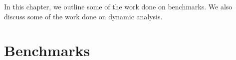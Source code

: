 In this chapter, we outline some of the work done on benchmarks.
We also discuss some of the work done on dynamic analysis.

\section{Benchmarks}

